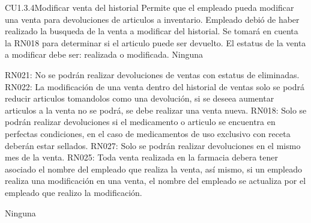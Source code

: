 \begin{UseCase} {CU1.3.4}{Modificar venta del historial}{
	Permite que el empleado pueda modificar una venta para devoluciones de articulos a inventario.
}
	{
		\UCli Empleado debió de haber realizado la busqueda de la venta a modificar del historial.
		\UCli Se tomará en cuenta la RN018 para determinar si el articulo puede ser devuelto.
		\UCli El estatus de la venta a modificar debe ser: realizada o modificada.
	}
	{
		Ninguna
	}
	{
		\UCli RN021: No se podrán realizar devoluciones de ventas con estatus de eliminadas.
		\UCli RN022: La modificación de una venta dentro del historial de ventas solo se podrá reducir articulos tomandolos como una devolución, si se deseea aumentar articulos a la venta no se podrá, se debe realizar una venta nueva.
		\UCli RN018: Solo se podrán realizar devoluciones si el medicamento o articulo se encuentra en perfectas condiciones, en el caso de medicamentos de uso exclusivo con receta deberán estar sellados.
		\UCli RN027: Solo se podrán realizar devoluciones en el mismo mes de la venta.
		\UCli RN025: Toda venta realizada en la farmacia debera tener asociado el nombre del empleado que realiza la venta, así mismo, si un empleado realiza una modificación en una venta, el nombre del empleado se actualiza por el empleado que realizo la modificación.
		
	}
	{
		Ninguna
	}
\end{UseCase}


